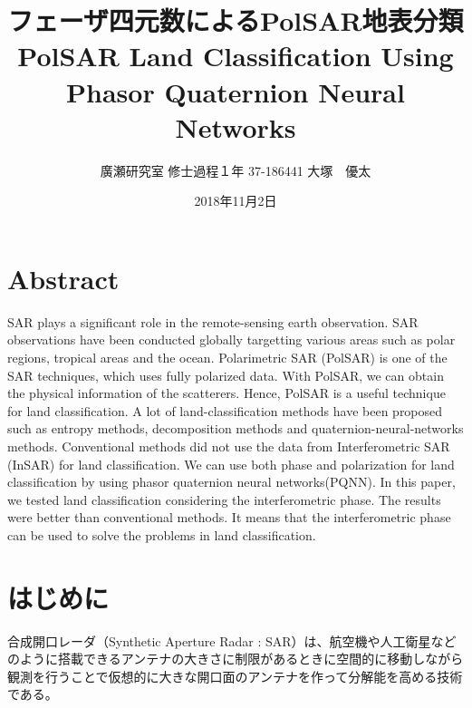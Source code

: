 \documentclass[a4j, twocolumn]{jsarticle}
\title{フェーザ四元数によるPolSAR地表分類\\PolSAR Land Classification Using Phasor Quaternion Neural Networks}
\author{廣瀬研究室 修士過程１年 37-186441 大塚　優太}
\date{2018年11月2日}
\begin{document}

\section*{Abstract}
SAR plays a significant role in the remote-sensing earth observation. SAR observations have been conducted globally targetting various areas such as polar regions, tropical areas and the ocean. Polarimetric SAR (PolSAR) is one of the SAR techniques, which uses fully polarized data. With PolSAR, we can obtain the physical information of the scatterers. Hence, PolSAR is a useful technique for land classification. A lot of land-classification methods have been proposed such as entropy methods, decomposition methods and quaternion-neural-networks methods. Conventional methods did not use the data from Interferometric SAR (InSAR) for land classification. We can use both phase and polarization for land classification by using phasor quaternion neural networks(PQNN). In this paper, we tested land classification considering the interferometric phase. The results were better than conventional methods. It means that the interferometric phase can be used to solve the problems in land classification.

\section{はじめに}
合成開口レーダ（Synthetic Aperture Radar : SAR）は、航空機や人工衛星などのように搭載できるアンテナの大きさに制限があるときに空間的に移動しながら観測を行うことで仮想的に大きな開口面のアンテナを作って分解能を高める技術である。
\end{document}
